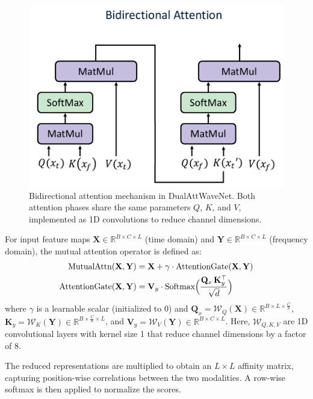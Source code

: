 \documentclass[conference]{IEEEtran}
\begin{document}
\begin{figure}[htbp]
    \centering
    \includegraphics[width=0.65\linewidth]{bidirectional-attention.pdf}
    \caption{Bidirectional attention mechanism in DualAttWaveNet. Both attention phases share the same parameters $Q$, $K$, and $V$, implemented as 1D convolutions to reduce channel dimensions.}
    \label{fig:bidirectional-attention}
\end{figure}

For input feature maps $\mathbf{X} \in \mathbb{R}^{B \times C \times L}$ (time domain) and $\mathbf{Y} \in \mathbb{R}^{B \times C \times L}$ (frequency domain), the mutual attention operator is defined as:
\begin{equation}
    \begin{aligned}
        \text{MutualAttn}(\mathbf{X}, \mathbf{Y})    & = \mathbf{X} + \gamma \cdot \text{AttentionGate}(\mathbf{X}, \mathbf{Y})                         \\
        \text{AttentionGate}(\mathbf{X}, \mathbf{Y}) & = \mathbf{V}_y \cdot \text{Softmax}\Bigl(\frac{\mathbf{Q}_x\, \mathbf{K}_y^\top}{\sqrt{d}}\Bigr)
    \end{aligned}
\end{equation}
where $\gamma$ is a learnable scalar (initialized to 0) and $\mathbf{Q}_x = \mathcal{W}_Q(\mathbf{X}) \in \mathbb{R}^{B \times L \times \frac{C}{8}}$, $\mathbf{K}_y = \mathcal{W}_K(\mathbf{Y}) \in \mathbb{R}^{B \times \frac{C}{8} \times L}$, and $\mathbf{V}_y = \mathcal{W}_V(\mathbf{Y}) \in \mathbb{R}^{B \times C \times L}$. Here, $\mathcal{W}_{Q,K,V}$ are 1D convolutional layers with kernel size 1 that reduce channel dimensions by a factor of 8.

The reduced representations are multiplied to obtain an $L \times L$ affinity matrix, capturing position-wise correlations between the two modalities. A row-wise softmax is then applied to normalize the scores.
\end{document}

